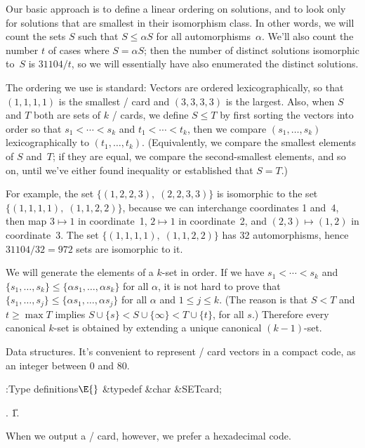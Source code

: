 Our basic approach is to define a linear ordering on solutions, and to
look only for solutions that are smallest in their isomorphism class.
In other words, we will count the sets $S$ such that $S\le\alpha S$ for
all automorphisms~$\alpha$. We'll also count the number $t$ of cases where
$S=\alpha S$; then the number of distinct solutions isomorphic to~$S$
is $31104/t$, so we will essentially have also enumerated the distinct
solutions.

The ordering we use is standard: Vectors are ordered lexicographically,
so that $(1,1,1,1)$ is the smallest \SET/ card and $(3,3,3,3)$ is the largest.
Also, when $S$ and $T$ both are sets of $k$ \SET/ cards, we define
$S\le T$ by first sorting the vectors into order so that $s_1<\cdots<s_k$ and
$t_1<\cdots<t_k$, then we compare $(s_1,\ldots,s_k)$ lexicographically
to $(t_1,\ldots,t_k)$. (Equivalently, we compare the smallest elements
of $S$ and~$T$; if they are equal, we compare the second-smallest elements,
and so on, until we've either found inequality or established that $S=T$.)

For example, the set $\{(1,2,2,3),\;(2,2,3,3)\}$ is isomorphic to the
set $\{(1,1,1,1),\;(1,1,2,2)\}$, because we can interchange coordinates
1 and~4, then map $3\mapsto1$ in coordinate~1, $2\mapsto1$ in coordinate~2,
and $(2,3)\mapsto(1,2)$ in coordinate~3. The set $\{(1,1,1,1),\;(1,1,2,2)\}$
has 32 automorphisms, hence $31104/32=972$ sets are isomorphic to it.

We will generate the elements of a $k$-set in order. If we have
$s_1<\cdots<s_k$ and $\{s_1,\ldots,s_k\}\le\{\alpha s_1,\ldots,\alpha s_k\}$
for all $\alpha$, it is not hard to prove that $\{s_1,\ldots,s_j\}\le\{\alpha
s_1,\ldots,\alpha s_j\}$ for all $\alpha$ and $1\le j\le k$.
(The reason is that $S<T$ and $t\ge\max T$ implies
$S\cup\{s\}<S\cup\{\infty\}<T\cup\{t\}$, for all $s$.)
Therefore every canonical $k$-set is obtained by extending a unique
canonical $(k-1)$-set.

\fi

Data structures.
It's convenient to represent \SET/ card vectors in a compact code,
as an integer between 0 and 80.

\Y\B\4:Type definitions\X${}\E{}$\6
\&{typedef} \&{char} \&{SETcard};\par
{}.
\U1.\fi

When we output a \SET/ card, however, we prefer a hexadecimal code.

